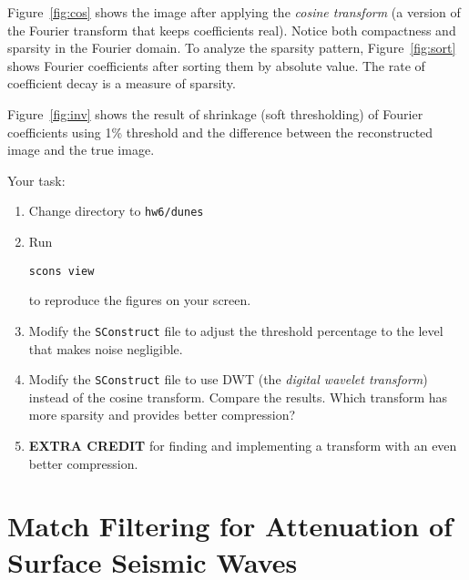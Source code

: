 
Figure~\ref{fig:cos} shows the image after applying the \emph{cosine
transform} (a version of the Fourier transform that keeps coefficients
real). Notice both compactness and sparsity in the Fourier domain. To
analyze the sparsity pattern, Figure~\ref{fig:sort} shows Fourier
coefficients after sorting them by absolute value. The rate 
of coefficient decay is a measure of sparsity.


Figure~\ref{fig:inv} shows the result of shrinkage (soft thresholding)
of Fourier coefficients using 1\% threshold and the difference between
the reconstructed image and the true image.

Your task:
\begin{enumerate}
\item Change directory to \texttt{hw6/dunes}
\item Run 
\begin{verbatim}
scons view
\end{verbatim}
to reproduce the figures on your screen.
\item Modify the \texttt{SConstruct} file to adjust the threshold percentage to the level that makes noise negligible.
\item  Modify the \texttt{SConstruct} file to use DWT (the \emph{digital wavelet transform}) instead of the cosine transform. 
Compare the results. Which transform has more sparsity and provides better compression? 
\item \textbf{EXTRA CREDIT} for finding and implementing a transform with an even better compression.
\end{enumerate}

\newpage

\lstset{language=python,numbers=left,numberstyle=\tiny,showstringspaces=false}


\section{Match Filtering for Attenuation of Surface Seismic Waves}


